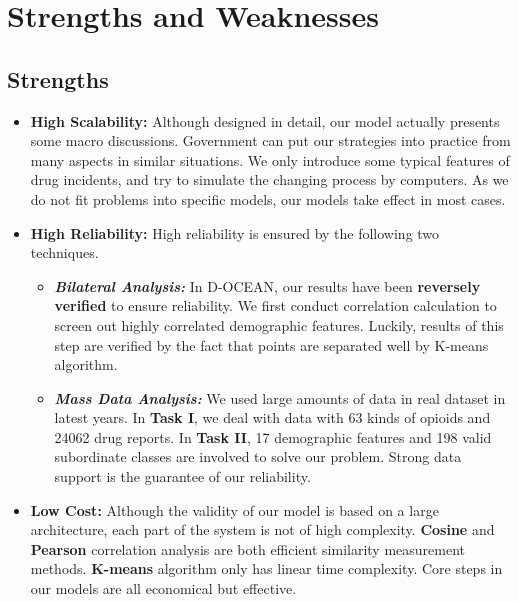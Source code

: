 \documentclass[a4paper]{article}
\begin{document}
\section{Strengths and Weaknesses}

\subsection{Strengths}

\begin{itemize}
  \item \textbf{High Scalability:} Although designed in detail, our model actually presents some macro discussions. Government can put our strategies into practice from many aspects in similar situations. We only introduce some typical features of drug incidents, and try to simulate the changing process by computers. As we do not fit problems into specific models, our models take effect in most cases.
  \item \textbf{High Reliability:} High reliability is ensured by the following two techniques.
  \begin{itemize}
      \item \textit{\textbf{Bilateral Analysis:}} In D-OCEAN, our results have been \textbf{reversely verified} to ensure reliability. We first conduct correlation calculation to screen out highly correlated demographic features. Luckily, results of this step are verified by the fact that points are separated well by K-means algorithm.
      \item \textit{\textbf{Mass Data Analysis:}} We used large amounts of data in real dataset in latest years. In \textbf{Task I}, we deal with data with 63 kinds of opioids and 24062 drug reports. In \textbf{Task II}, 17 demographic features and 198 valid subordinate classes are involved to solve our problem. Strong data support is the guarantee of our reliability.
  \end{itemize} 
  \item \textbf{Low Cost:} Although the validity of our model is based on a large architecture, each part of the system is not of high complexity. \textbf{Cosine} and \textbf{Pearson} correlation analysis are both efficient similarity measurement methods. \textbf{K-means} algorithm only has linear time complexity. Core steps in our models are all economical but effective.
  
\end{itemize}
\end{document}
